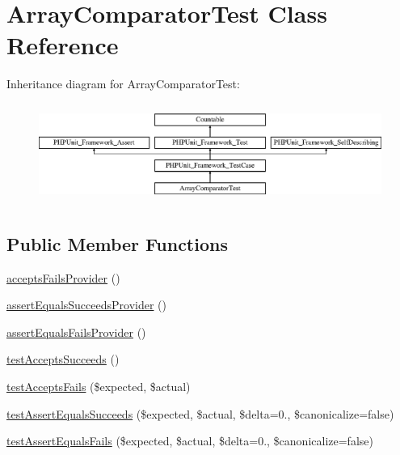 \hypertarget{class_sebastian_bergmann_1_1_comparator_1_1_array_comparator_test}{}\section{Array\+Comparator\+Test Class Reference}
\label{class_sebastian_bergmann_1_1_comparator_1_1_array_comparator_test}
Inheritance diagram for Array\+Comparator\+Test\+:\begin{figure}[H]
\begin{center}
\leavevmode
\includegraphics[height=3.303835cm]{class_sebastian_bergmann_1_1_comparator_1_1_array_comparator_test}
\end{center}
\end{figure}
\subsection*{Public Member Functions}
\begin{DoxyCompactItemize}
\item 
\mbox{\hyperlink{class_sebastian_bergmann_1_1_comparator_1_1_array_comparator_test_a9ea19e26cacbca06356c2f229079f8a1}{accepts\+Fails\+Provider}} ()
\item 
\mbox{\hyperlink{class_sebastian_bergmann_1_1_comparator_1_1_array_comparator_test_acb6bc1b6e9d32990bdd287f8b590a5fa}{assert\+Equals\+Succeeds\+Provider}} ()
\item 
\mbox{\hyperlink{class_sebastian_bergmann_1_1_comparator_1_1_array_comparator_test_a3cc10e39239b6e3f3fda1d34c0fb1c14}{assert\+Equals\+Fails\+Provider}} ()
\item 
\mbox{\hyperlink{class_sebastian_bergmann_1_1_comparator_1_1_array_comparator_test_a585e8e34047f506e60cd80f3c3b5373a}{test\+Accepts\+Succeeds}} ()
\item 
\mbox{\hyperlink{class_sebastian_bergmann_1_1_comparator_1_1_array_comparator_test_afe5eff1a1b7049f973a035117a7e0df1}{test\+Accepts\+Fails}} (\$expected, \$actual)
\item 
\mbox{\hyperlink{class_sebastian_bergmann_1_1_comparator_1_1_array_comparator_test_a2028fcfb540175cac3029f13050d5fb0}{test\+Assert\+Equals\+Succeeds}} (\$expected, \$actual, \$delta=0., \$canonicalize=false)
\item 
\mbox{\hyperlink{class_sebastian_bergmann_1_1_comparator_1_1_array_comparator_test_aee311f5d22953c5c54ce94c4f3b3a793}{test\+Assert\+Equals\+Fails}} (\$expected, \$actual, \$delta=0., \$canonicalize=false)
\end{DoxyCompactItemize}
